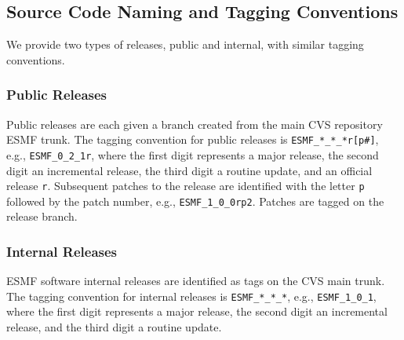 
\subsection{Source Code Naming and Tagging Conventions}
\label{sec:tagging}

We provide two types of releases, public and internal, with similar tagging conventions.

\subsubsection{Public Releases}
Public releases are each given a branch created from the main CVS repository ESMF trunk. The tagging convention
for public releases is
{\tt ESMF\_*\_*\_*r[p\#]}, e.g., {\tt ESMF\_0\_2\_1r}, where the first digit represents a major release, the
second digit an incremental release, the third digit a routine update, and an official release {\tt r}.
Subsequent patches to the release are identified with the letter {\tt p} followed by the patch number,
e.g., {\tt ESMF\_1\_0\_0rp2}. Patches are tagged on the release branch.

\subsubsection{Internal Releases}
ESMF software internal releases are identified as tags on the CVS main trunk.
The tagging convention for internal releases is
{\tt ESMF\_*\_*\_*}, e.g., {\tt ESMF\_1\_0\_1}, where the first digit represents a
major release, the second digit an incremental release, and the third digit a routine update.

